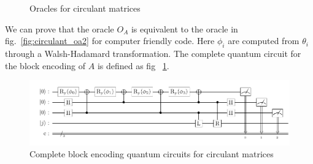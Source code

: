 \documentclass{article}
\begin{document}
\begin{figure}[htbp]
  \centering
  \caption{Oracles for circulant matrices}
\end{figure}

We can prove that the oracle $O_A$ is equivalent to the oracle in fig.~\ref{fig:circulant_oa2} for computer friendly code. Here $\phi_i$ are computed from $\theta_i$ through a Walsh-Hadamard transformation. The complete quantum circuit for the block encoding of $A$ is defined as fig ~\ref{fig:circulant_circuit}.

\begin{figure}[htbp]
  \centering
  \includegraphics{pdf/circulant_circuit}
  \caption{
    Complete block encoding quantum circuits for circulant matrices
  }
  \label{fig:circulant_circuit}
\end{figure}
\end{document}
